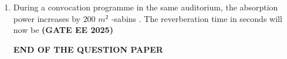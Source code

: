 \documentclass[journal,12pt,onecolumn]{IEEEtran}
\theoremstyle{remark}
\begin{document}
\begin{enumerate}
\item  During a convocation programme in the same auditorium, the absorption power increases by $200$ $m^2$ -sabins . The reverberation time in seconds will now be \hfill\textbf{(GATE EE 2025)}
\begin{enumerate}
\end{enumerate}
\begin{center}
    \textbf{END OF THE QUESTION PAPER}
\end{center}
\end{enumerate}
\end{document}
